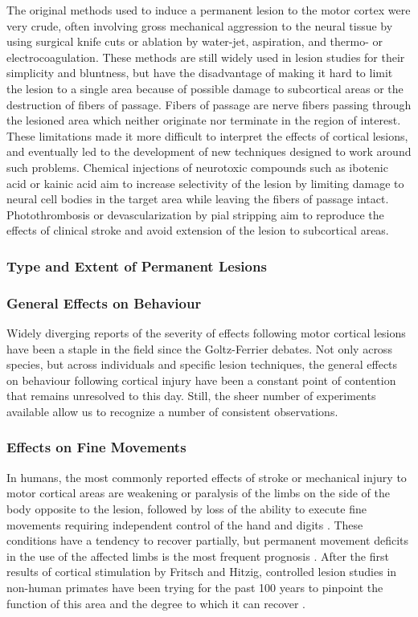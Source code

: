 The original methods used to induce a permanent lesion to the motor cortex were very crude, often involving gross mechanical aggression to the neural tissue by using surgical knife cuts or ablation by water-jet, aspiration, and thermo- or electrocoagulation. These methods are still widely used in lesion studies for their simplicity and bluntness, but have the disadvantage of making it hard to limit the lesion to a single area because of possible damage to subcortical areas or the destruction of fibers of passage. Fibers of passage are nerve fibers passing through the lesioned area which neither originate nor terminate in the region of interest. These limitations made it more difficult to interpret the effects of cortical lesions, and eventually led to the development of new techniques designed to work around such problems. Chemical injections of neurotoxic compounds such as ibotenic acid or kainic acid aim to increase selectivity of the lesion by limiting damage to neural cell bodies in the target area while leaving the fibers of passage intact. Photothrombosis or devascularization by pial stripping aim to reproduce the effects of clinical stroke and avoid extension of the lesion to subcortical areas.

\subsubsection{Type and Extent of Permanent Lesions}

\subsubsection{General Effects on Behaviour}

Widely diverging reports of the severity of effects following motor cortical lesions have been a staple in the field since the Goltz-Ferrier debates. Not only across species, but across individuals and specific lesion techniques, the general effects on behaviour following cortical injury have been a constant point of contention that remains unresolved to this day. Still, the sheer number of experiments available allow us to recognize a number of consistent observations.

\subsubsection{Effects on Fine Movements}

In humans, the most commonly reported effects of stroke or mechanical injury to motor cortical areas are weakening or paralysis of the limbs on the side of the body opposite to the lesion, followed by loss of the ability to execute fine movements requiring independent control of the hand and digits \cite{Xu2015}. These conditions have a tendency to recover partially, but permanent movement deficits in the use of the affected limbs is the most frequent prognosis \cite{Kwakkel2003}. After the first results of cortical stimulation by Fritsch and Hitzig, controlled lesion studies in non-human primates have been trying for the past 100 years to pinpoint the function of this area and the degree to which it can recover \cite{Darling2011}.

